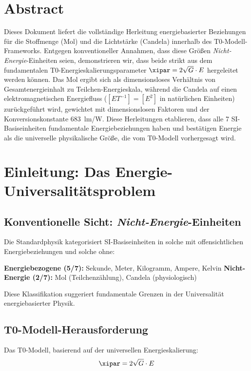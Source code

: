 \section*{Abstract}
		Dieses Dokument liefert die vollständige Herleitung energiebasierter Beziehungen für die Stoffmenge (Mol) und die Lichtstärke (Candela) innerhalb des T0-Modell-Frameworks. Entgegen konventioneller Annahmen, dass diese Größen \textit{Nicht-Energie}-Einheiten seien, demonstrieren wir, dass beide strikt aus dem fundamentalen T0-Energieskalierungsparameter $\xipar = 2\sqrt{G} \cdot E$ hergeleitet werden können. Das Mol ergibt sich als dimensionsloses Verhältnis von Gesamtenergieinhalt zu Teilchen-Energieskala, während die Candela auf einen elektromagnetischen Energiefluss ($[E T^{-1}] = [E^2]$ in natürlichen Einheiten) zurückgeführt wird, gewichtet mit dimensionslosen Faktoren und der Konversionskonstante 683~lm/W. Diese Herleitungen etablieren, dass alle 7 SI-Basiseinheiten fundamentale Energiebeziehungen haben und bestätigen Energie als die universelle physikalische Größe, die vom T0-Modell vorhergesagt wird.

	
	
	\section{Einleitung: Das Energie-Universalitätsproblem}
	\label{sec:einleitung}
	
	\subsection{Konventionelle Sicht: \textit{Nicht-Energie}-Einheiten}
	\label{subsec:konventionelle_sicht}
	
	Die Standardphysik kategorisiert SI-Basiseinheiten in solche mit offensichtlichen Energiebeziehungen und solche ohne:
	
	\textbf{Energiebezogene (5/7):} Sekunde, Meter, Kilogramm, Ampere, Kelvin
	\textbf{Nicht-Energie (2/7):} Mol (Teilchenzählung), Candela (physiologisch)
	
	Diese Klassifikation suggeriert fundamentale Grenzen in der Universalität energiebasierter Physik.
	
	\subsection{T0-Modell-Herausforderung}
	\label{subsec:t0_herausforderung}
	
	Das T0-Modell, basierend auf der universellen Energieskalierung:
	\begin{equation}
		\xipar = 2\sqrt{G} \cdot E
		\label{eq:t0_fundamental}
	\end{equation}
	
